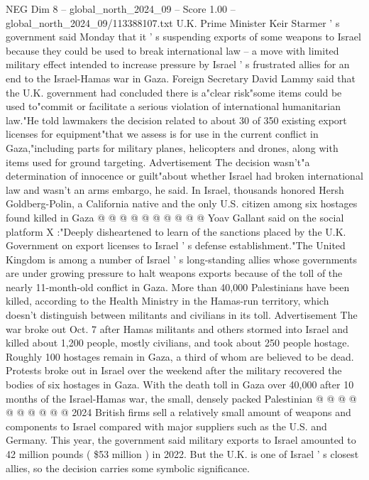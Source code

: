 \begin{textsample}{NEG Dim 8 – global\_north\_2024\_09 – Score 1.00 – global\_north\_2024\_09/113388107.txt}  \label{ex:f8_neg_377}
U.K.
Prime Minister Keir Starmer ' s government said Monday that it ' s suspending exports of some weapons to Israel because they could be used to break international law -- a move with limited military effect intended to increase pressure by Israel ' s frustrated allies for an end to the Israel-Hamas war in Gaza.
Foreign Secretary David Lammy said that the U.K. government had concluded there is a"clear risk"some items could be used to"commit or facilitate a serious violation of international humanitarian law."He told lawmakers the decision related to about 30 of 350 existing export licenses for equipment"that we assess is for use in the current conflict in Gaza,"including parts for military planes, helicopters and drones, along with items used for ground targeting.
Advertisement The decision wasn't"a determination of innocence or guilt"about whether Israel had broken international law and wasn't an arms embargo, he said.
In Israel, thousands honored Hersh Goldberg-Polin, a California native and the only U.S. citizen among six hostages found killed in Gaza @ @ @ @ @ @ @ @ @ @ Yoav Gallant said on the social platform X :"Deeply disheartened to learn of the sanctions placed by the U.K.
Government on export licenses to Israel ' s defense establishment."The United Kingdom is among a number of Israel ' s long-standing allies whose governments are under growing pressure to halt weapons exports because of the toll of the nearly 11-month-old conflict in Gaza.
More than 40,000 Palestinians have been killed, according to the Health Ministry in the Hamas-run territory, which doesn't distinguish between militants and civilians in its toll.
Advertisement The war broke out Oct. 7 after Hamas militants and others stormed into Israel and killed about 1,200 people, mostly civilians, and took about 250 people hostage.
Roughly 100 hostages remain in Gaza, a third of whom are believed to be dead.
Protests broke out in Israel over the weekend after the military recovered the bodies of six hostages in Gaza.
With the death toll in Gaza over 40,000 after 10 months of the Israel-Hamas war, the small, densely packed Palestinian @ @ @ @ @ @ @ @ @ @ 2024 British firms sell a relatively small amount of weapons and components to Israel compared with major suppliers such as the U.S. and Germany.
This year, the government said military exports to Israel amounted to 42 million pounds ( \$53 million ) in 2022.
But the U.K. is one of Israel ' s closest allies, so the decision carries some symbolic significance.

\end{textsample}
